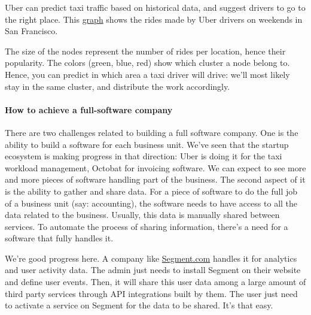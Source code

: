 \documentclass[12pt]{article}
\begin{document}
\smallskip

Uber can predict taxi traffic based on historical data, and suggest drivers to
go to the right place. This
\href{http://blogs.mathworks.com/loren/2014/09/06/analyzing-uber-ride-sharing-gps-data/}
{graph} shows the rides made by Uber drivers on weekends in San Francisco.

The size of the nodes represent the number of rides per location, hence their
popularity. The colors (green, blue, red) show which cluster a node belong to.
Hence, you can predict in which area a taxi driver will drive: we'll most likely
stay in the same cluster, and distribute the work accordingly.

\smallskip

\paragraph{How to achieve a full-software company}

There are two challenges related to building a full software company. One is the
ability to build a software for each business unit. We've seen that the startup
ecosystem is making progress in that direction: Uber is doing it for the taxi
workload management, Octobat for invoicing software. We can expect to see more
and more pieces of software handling part of the business. The second aspect of
it is the ability to gather and share data. For a piece of software to do the
full job of a business unit (say: accounting), the software needs to have access
to all the data related to the business. Usually, this data is manually shared
between services. To automate the process of sharing information, there's a need
for a software that fully handles it.

We're good progress here. A company like
\href{https://segment.com/}{Segment.com} handles it for analytics and user
activity data. The admin just needs to install Segment on their website and
define user events. Then, it will share this user data among a large amount of
third party services through API integrations built by them. The user just need
to activate a service on Segment for the data to be shared. It's that easy.

\smallskip
\end{document}
